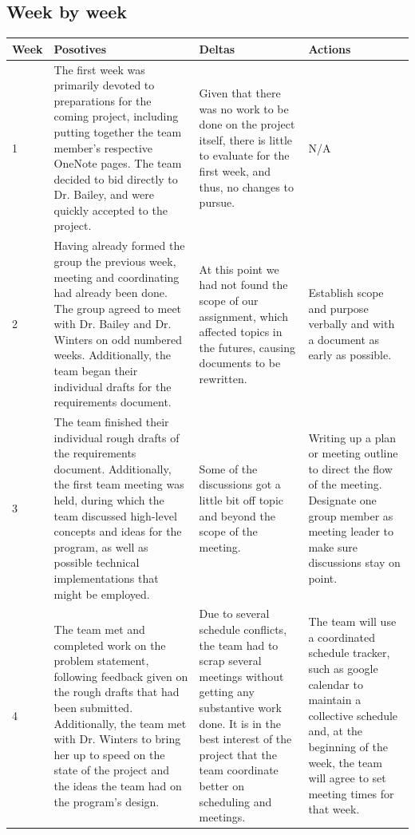 \documentclass[onecolumn, draftclsnofoot,10pt, compsoc]{IEEEtran}
\begin{document}
\subsection{Week by week}

\begin{center}
	\begin{tabular}{ | m{1cm} |m{5cm} | m{5cm}| m{5cm} | } 
		\hline
		Week & Posotives & Deltas & Actions \\ 
		\hline
		
		1 & 
		The first week was primarily devoted to preparations for the coming project, including putting together the team member’s respective OneNote pages. The team decided to bid directly to Dr. Bailey, and were quickly accepted to the project. & 
		Given that there was no work to be done on the project itself, there is little to evaluate for the first week, and thus, no changes to pursue. &
		N/A \\ 
		\hline
		
		2 &
		Having already formed the group the previous week, meeting and coordinating had already been done. The group agreed to meet with Dr. Bailey and Dr. Winters on odd numbered weeks. Additionally, the team began their individual drafts for the requirements document. &
		At this point we had not found the scope of our assignment, which affected topics in the futures, causing documents to be rewritten. &
		Establish scope and purpose verbally and with a document as early as possible. \\
		\hline
		
		3 &
		The team finished their individual rough drafts of the requirements document. Additionally, the first team meeting was held, during which the team discussed high-level concepts and ideas for the program, as well as possible technical implementations that might be employed. &
		Some of the discussions got a little bit off topic and beyond the scope of the meeting.&
		Writing up a plan or meeting outline to direct the flow of the meeting. Designate one group member as meeting leader to make sure discussions stay on point. \\
		\hline
		
		4 &
		The team met and completed work on the problem statement, following feedback given on the rough drafts that had been submitted. Additionally, the team met with Dr. Winters to bring her up to speed on the state of the project and the ideas the team had on the program’s design. &
		Due to several schedule conflicts, the team had to scrap several meetings without getting any substantive work done. It is in the best interest of the project that the team coordinate better on scheduling and meetings. &
		The team will use a coordinated schedule tracker, such as google calendar to maintain a collective schedule and, at the beginning of the week, the team will agree to set meeting times for that week. \\
		\hline
	\end{tabular}


\end{center}
\end{document}
